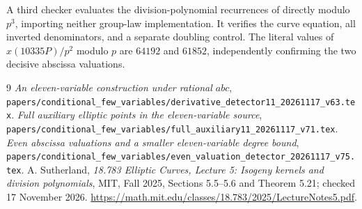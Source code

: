 \documentclass[11pt,a4paper]{article}
\begin{document}
A third checker evaluates the division-polynomial recurrences of
\cite[Sections 5.5--5.6]{Division} directly modulo $p^3$, importing
neither group-law implementation. It verifies the curve equation,
all inverted denominators, and a separate doubling control. The
literal values of $x(10335P)/p^2$ modulo $p$ are $64192$ and $61852$,
independently confirming the two decisive abscissa valuations.

\begin{thebibliography}{9}
\emph{An eleven-variable construction under rational $abc$},
\nolinkurl{papers/conditional_few_variables/derivative_detector11_20261117_v63.tex}.
\emph{Full auxiliary elliptic points in the eleven-variable source},
\nolinkurl{papers/conditional_few_variables/full_auxiliary11_20261117_v71.tex}.
\emph{Even abscissa valuations and a smaller eleven-variable degree bound},
\nolinkurl{papers/conditional_few_variables/even_valuation_detector_20261117_v75.tex}.
A. Sutherland, \emph{18.783 Elliptic Curves,
Lecture 5: Isogeny kernels and division polynomials}, MIT, Fall 2025,
Sections 5.5--5.6 and Theorem 5.21; checked 17 November 2026.
\url{https://math.mit.edu/classes/18.783/2025/LectureNotes5.pdf}.
\end{thebibliography}
\end{document}
